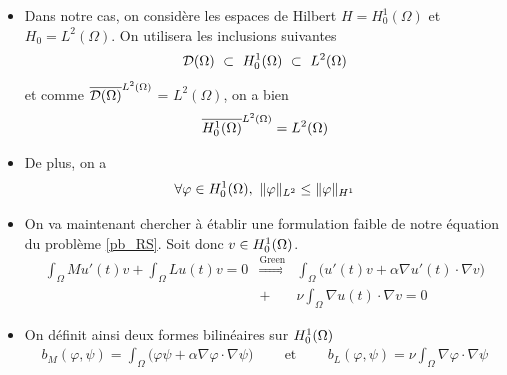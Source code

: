 \begin{frame}
    \begin{itemize}
    \item Dans notre cas, on considère les espaces de Hilbert $H=H^1_0(\Omega)$ et $H_0=L^2(\Omega)$. On utilisera les inclusions suivantes
\begin{equation*}
    \calD(\Omega) \ \subset \ \Hone \ \subset \ L^2(\Omega)
\end{equation*}
et comme $\overline{\mathcal{D}(\Omega)}^{L^2(\Omega)}$ = $L^2(\Omega)$, on a bien 
\begin{equation*}
    \overline{H^1_0(\Omega)}^{L^2(\Omega)} = L^2(\Omega)
\end{equation*} 
\item De plus, on a 
\begin{equation*}
    \forall \varphi \in H^1_0(\Omega), \ \|\varphi\|_{L^2} \leq \|\varphi\|_{H^1}
\end{equation*}
    \item On va maintenant chercher à établir une formulation faible de notre équation du problème \eqref{pb_RS}. Soit donc $v \in H^1_0(\Omega)$. 
\begin{eqnarray*}
    \int_{\Omega}Mu'(t)v + \int_{\Omega} Lu(t)v =0 %
    &\overset{\text{Green}}{\Longrightarrow}& \int_{\Omega} \big(u'(t)v+\alpha\nabla u'(t)\cdot\nabla v\big) \\
    &+& \nu\int_{\Omega} \nabla u(t)\cdot \nabla v = 0
\end{eqnarray*} 
\item On définit ainsi deux formes bilinéaires sur $H^1_0(\Omega)$
\begin{eqnarray*}
    b_M(\varphi, \psi) = \int_{\Omega} \big(\varphi\psi+\alpha\nabla \varphi\cdot\nabla \psi\big) \ \ \ \ \ &\text{ et }& \ \ \ \ \
    b_L(\varphi, \psi) = \nu\int_{\Omega} \nabla \varphi\cdot \nabla \psi
\end{eqnarray*} 
\end{itemize}
\end{frame}

